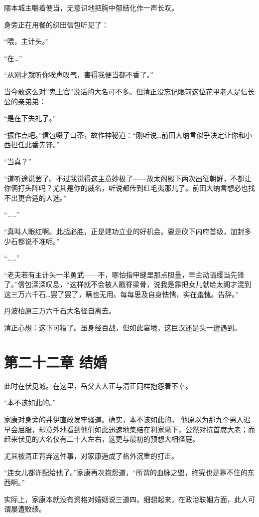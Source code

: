 \documentclass[
]{book}
\begin{document}
隈本城主嚼着便当，无意识地把胸中郁结化作一声长叹。

身旁正在用餐的织田信包听见了：

``喂，主计头。''

``在\ldots{}''

``从刚才就听你唉声叹气，害得我便当都不香了。''

当今敢这么对''鬼上官''说话的大名可不多。但清正没忘记眼前这位花甲老人是信长公的亲弟弟：

``是在下失礼了。''

``振作点吧。''信包啜了口茶，故作神秘道：``刚听说\ldots 前田大纳言似乎决定让你和小西担任此番先锋。''

``当真？''

``道听途说罢了。不过我觉得这主意妙极了------故太阁殿下两次出征朝鲜，不都让你俩打头阵吗？尤其是你的威名，听说都传到红毛夷那儿了。前田大纳言想必也找不出更合适的人选。''

``\ldots\ldots{}''

``真叫人眼红啊。此战必胜，正是建功立业的好机会。要是砍下内府首级，加封多少石都说不准呢。''

``\ldots\ldots{}''

``老夫若有主计头一半勇武------不，哪怕指甲缝里那点胆量，早主动请缨当先锋了。''信包深深叹息，``这样就不会被人戳脊梁骨，说我是靠把女儿献给太阁才混到这三万六千石\ldots 罢了罢了，瞒也无用。每每思及自身怯懦，实在羞愧。告辞。''

丹波柏原三万六千石大名径自离去。

清正心想：这下可糟了。虽身经百战，但如此窘境，这巨汉还是头一遭遇到。

\chapter*{第二十二章 结婚}\label{ux7b2cux4e8cux5341ux4e8cux7ae0-ux7ed3ux5a5a}

此时在伏见城。在这里，岳父大人正与清正同样抱怨着不幸。

``本不该如此的。''

家康对身旁的井伊直政发牢骚道。确实，本不该如此的。 他原以为那九个男人迟早会屈服，却意外地看到他们如此迅速地集结在利家麾下，公然对抗首席大老；而赶来伏见的大名仅有二十人左右，这更与最初的预想大相径庭。

尤其被清正背弃这件事，对家康造成了格外沉重的打击。

``连女儿都许配给他了。''家康再次抱怨道，``所谓的血脉之盟，终究也是靠不住的东西啊。''

实际上，家康本就没有资格对婚姻说三道四。细想起来，在政治联姻方面，此人可谓屡遭败绩。
\end{document}
